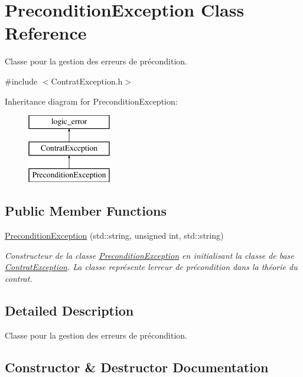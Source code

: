 \hypertarget{classPreconditionException}{}\section{Precondition\+Exception Class Reference}
\label{classPreconditionException}


Classe pour la gestion des erreurs de précondition.  




{\ttfamily \#include $<$Contrat\+Exception.\+h$>$}

Inheritance diagram for Precondition\+Exception\+:\begin{figure}[H]
\begin{center}
\leavevmode
\includegraphics[height=3.000000cm]{classPreconditionException}
\end{center}
\end{figure}
\subsection*{Public Member Functions}
\begin{DoxyCompactItemize}
\item 
\hyperlink{classPreconditionException_a66d4b4c57a0675d487dab85d2c31b08c}{Precondition\+Exception} (std\+::string, unsigned int, std\+::string)
\begin{DoxyCompactList}\small\item\em Constructeur de la classe \hyperlink{classPreconditionException}{Precondition\+Exception} en initialisant la classe de base \hyperlink{classContratException}{Contrat\+Exception}. La classe représente l\textquotesingle{}erreur de précondition dans la théorie du contrat. \end{DoxyCompactList}\end{DoxyCompactItemize}


\subsection{Detailed Description}
Classe pour la gestion des erreurs de précondition. 

\subsection{Constructor \& Destructor Documentation}
\mbox{\label{classPreconditionException_a66d4b4c57a0675d487dab85d2c31b08c}} 
